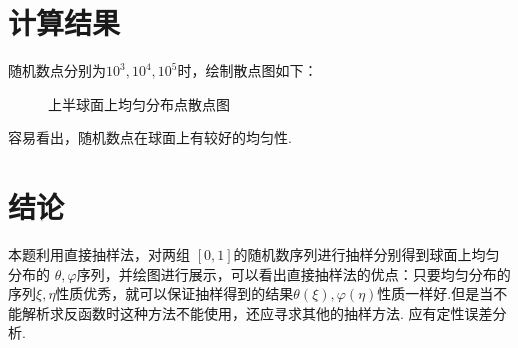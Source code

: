 \documentclass[12pt,a4paper,utf8]{ctexart}
\begin{document}
\section{计算结果}
随机数点分别为$10^3,10^4,10^5$时，绘制散点图如下：
\begin{figure}[h]
    \centering
    \hfill
    \hfill
    \caption{上半球面上均匀分布点散点图}
    \end{figure}

容易看出，随机数点在球面上有较好的均匀性.
\section{结论}

本题利用直接抽样法，对两组 $[0,1]$的随机数序列进行抽样分别得到球面上均匀分布的
$\theta,
\varphi$序列，并绘图进行展示，可以看出直接抽样法的优点：只要均匀分布的序列$\xi,
\eta$性质优秀，就可以保证抽样得到的结果$\theta(\xi),
\varphi(\eta)$性质一样好.但是当不能解析求反函数时这种方法不能使用，还应寻求其他的抽样方法.
\color{red} 应有定性误差分析.
\end{document}
